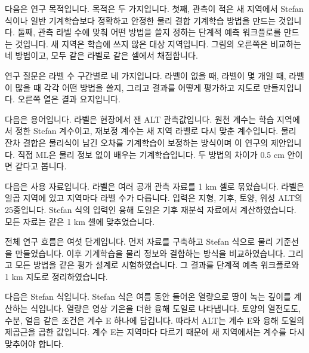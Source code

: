 다음은 연구 목적입니다. 목적은 두 가지입니다. 첫째, 관측이 적은 새 지역에서 Stefan 식이나 일반 기계학습보다 정확하고 안정한 물리 결합 기계학습 방법을 만드는 것입니다. 둘째, 관측 라벨 수에 맞춰 어떤 방법을 쓸지 정하는 단계적 예측 워크플로를 만드는 것입니다. 새 지역은 학습에 쓰지 않은 대상 지역입니다. 그림의 오른쪽은 비교하는 네 방법이고, 모두 같은 라벨로 같은 셀에서 채점합니다.



연구 질문은 라벨 수 구간별로 네 가지입니다. 라벨이 없을 때, 라벨이 몇 개일 때, 라벨이 많을 때 각각 어떤 방법을 쓸지, 그리고 결과를 어떻게 평가하고 지도로 만들지입니다. 오른쪽 열은 결과 요지입니다.



다음은 용어입니다. 라벨은 현장에서 잰 ALT 관측값입니다. 원천 계수는 학습 지역에서 정한 Stefan 계수이고, 재보정 계수는 새 지역 라벨로 다시 맞춘 계수입니다. 물리 잔차 결합은 물리식이 남긴 오차를 기계학습이 보정하는 방식이며 이 연구의 제안입니다. 직접 ML은 물리 정보 없이 배우는 기계학습입니다. 두 방법의 차이가 0.5 cm 안이면 같다고 봅니다.



다음은 사용 자료입니다. 라벨은 여러 공개 관측 자료를 1 km 셀로 묶었습니다. 라벨은 일곱 지역에 있고 지역마다 라벨 수가 다릅니다. 입력은 지형, 기후, 토양, 위성 ALT의 25종입니다. Stefan 식의 입력인 융해 도일은 기후 재분석 자료에서 계산하였습니다. 모든 자료는 같은 1 km 셀에 맞추었습니다.



전체 연구 흐름은 여섯 단계입니다. 먼저 자료를 구축하고 Stefan 식으로 물리 기준선을 만들었습니다. 이후 기계학습을 물리 정보와 결합하는 방식을 비교하였습니다. 그리고 모든 방법을 같은 평가 설계로 시험하였습니다. 그 결과를 단계적 예측 워크플로와 1 km 지도로 정리하였습니다.



다음은 Stefan 식입니다. Stefan 식은 여름 동안 들어온 열량으로 땅이 녹는 깊이를 계산하는 식입니다. 열량은 영상 기온을 더한 융해 도일로 나타냅니다. 토양의 열전도도, 수분, 얼음 같은 조건은 계수 E 하나에 담깁니다. 따라서 ALT는 계수 E와 융해 도일의 제곱근을 곱한 값입니다. 계수 E는 지역마다 다르기 때문에 새 지역에서는 계수를 다시 맞추어야 합니다.

